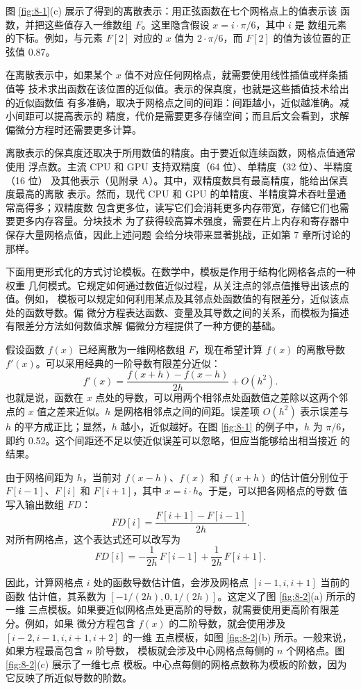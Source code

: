 图 \ref{fig:8-1}(c) 展示了得到的离散表示：用正弦函数在七个网格点上的值表示该
函数，并把这些值存入一维数组 $F$。这里隐含假设 $x=i\cdot\pi/6$，其中 $i$ 是
数组元素的下标。例如，与元素 $F[2]$ 对应的 $x$ 值为 $2\cdot\pi/6$，而 $F[2]$
的值为该位置的正弦值 0.87。

在离散表示中，如果某个 $x$ 值不对应任何网格点，就需要使用线性插值或样条插值等
技术求出函数在该位置的近似值。表示的保真度，也就是这些插值技术给出的近似函数值
有多准确，取决于网格点之间的间距：间距越小，近似越准确。减小间距可以提高表示的
精度，代价是需要更多存储空间；而且后文会看到，求解偏微分方程时还需要更多计算。

离散表示的保真度还取决于所用数值的精度。由于要近似连续函数，网格点值通常使用
浮点数。主流 CPU 和 GPU 支持双精度（64 位）、单精度（32 位）、半精度（16 位）
及其他表示（见附录 A）。其中，双精度数具有最高精度，能给出保真度最高的离散
表示。然而，现代 CPU 和 GPU 的单精度、半精度算术吞吐量通常高得多；双精度数
包含更多位，读写它们会消耗更多内存带宽，存储它们也需要更多内存容量。分块技术
为了获得较高算术强度，需要在片上内存和寄存器中保存大量网格点值，因此上述问题
会给分块带来显著挑战，正如第 7 章所讨论的那样。

下面用更形式化的方式讨论模板。在数学中，模板是作用于结构化网格各点的一种权重
几何模式。它规定如何通过数值近似过程，从关注点的邻点值推导出该点的值。例如，
模板可以规定如何利用某点及其邻点处函数值的有限差分，近似该点处的函数导数。偏
微分方程表达函数、变量及其导数之间的关系，而模板为描述有限差分方法如何数值求解
偏微分方程提供了一种方便的基础。

假设函数 $f(x)$ 已经离散为一维网格数组 $F$，现在希望计算 $f(x)$ 的离散导数
$f'(x)$。可以采用经典的一阶导数有限差分近似：
\[
  f'(x)=\frac{f(x+h)-f(x-h)}{2h}+O(h^2).
\]
也就是说，函数在 $x$ 点处的导数，可以用两个相邻点处函数值之差除以这两个邻点的
$x$ 值之差来近似。$h$ 是网格相邻点之间的间距。误差项 $O(h^2)$ 表示误差与 $h$
的平方成正比；显然，$h$ 越小，近似越好。在图 \ref{fig:8-1} 的例子中，$h$ 为
$\pi/6$，即约 0.52。这个间距还不足以使近似误差可以忽略，但应当能够给出相当接近
的结果。

由于网格间距为 $h$，当前对 $f(x-h)$、$f(x)$ 和 $f(x+h)$ 的估计值分别位于
$F[i-1]$、$F[i]$ 和 $F[i+1]$，其中 $x=i\cdot h$。于是，可以把各网格点的导数
值写入输出数组 $FD$：
\[
  FD[i]=\frac{F[i+1]-F[i-1]}{2h}.
\]
对所有网格点，这个表达式还可以改写为
\[
  FD[i]=-\frac{1}{2h}\,F[i-1]+\frac{1}{2h}\,F[i+1].
\]

因此，计算网格点 $i$ 处的函数导数估计值，会涉及网格点 $[i-1,i,i+1]$ 当前的函数
估计值，其系数为 $[-1/(2h),0,1/(2h)]$。这定义了图 \ref{fig:8-2}(a) 所示的一维
三点模板。如果要近似网格点处更高阶的导数，就需要使用更高阶有限差分。例如，如果
微分方程包含 $f(x)$ 的二阶导数，就会使用涉及 $[i-2,i-1,i,i+1,i+2]$ 的一维
五点模板，如图 \ref{fig:8-2}(b) 所示。一般来说，如果方程最高包含 $n$ 阶导数，
模板就会涉及中心网格点每侧的 $n$ 个网格点。图 \ref{fig:8-2}(c) 展示了一维七点
模板。中心点每侧的网格点数称为模板的阶数，因为它反映了所近似导数的阶数。

